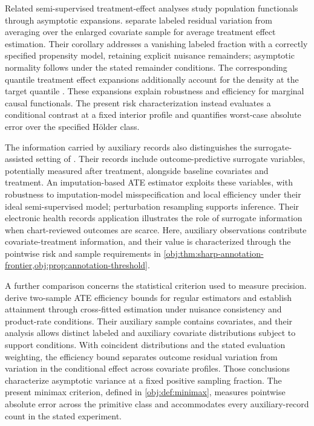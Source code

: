 Related semi-supervised treatment-effect analyses study population functionals through asymptotic expansions. \citet[Theorem 2.1 and Corollary 2.1]{ChakraborttyDai2022} separate labeled residual variation from averaging over the enlarged covariate sample for average treatment effect estimation. Their corollary addresses a vanishing labeled fraction with a correctly specified propensity model, retaining explicit nuisance remainders; asymptotic normality follows under the stated remainder conditions. The corresponding quantile treatment effect expansions additionally account for the density at the target quantile \citep[Theorem 3.1 and Corollary 3.1]{ChakraborttyDai2022}. These expansions explain robustness and efficiency for marginal causal functionals. The present risk characterization instead evaluates a conditional contrast at a fixed interior profile and quantifies worst-case absolute error over the specified H\"older class.

The information carried by auxiliary records also distinguishes the surrogate-assisted setting of \citet[Sections 2.1, 2.5--2.6, and 4]{ChengAnanthakrishnanCai2021}. Their records include outcome-predictive surrogate variables, potentially measured after treatment, alongside baseline covariates and treatment. An imputation-based ATE estimator exploits these variables, with robustness to imputation-model misspecification and local efficiency under their ideal semi-supervised model; perturbation resampling supports inference. Their electronic health records application illustrates the role of surrogate information when chart-reviewed outcomes are scarce. Here, auxiliary observations contribute covariate-treatment information, and their value is characterized through the pointwise risk and sample requirements in \cref{obj:thm:sharp-annotation-frontier,obj:prop:annotation-threshold}.

A further comparison concerns the statistical criterion used to measure precision. \citet[Theorems 4.2 and 4.4 and Corollary 4.5]{Kato2026} derive two-sample ATE efficiency bounds for regular estimators and establish attainment through cross-fitted estimation under nuisance consistency and product-rate conditions. Their auxiliary sample contains covariates, and their analysis allows distinct labeled and auxiliary covariate distributions subject to support conditions. With coincident distributions and the stated evaluation weighting, the efficiency bound separates outcome residual variation from variation in the conditional effect across covariate profiles. Those conclusions characterize asymptotic variance at a fixed positive sampling fraction. The present minimax criterion, defined in \cref{obj:def:minimax}, measures pointwise absolute error across the primitive class and accommodates every auxiliary-record count in the stated experiment.

